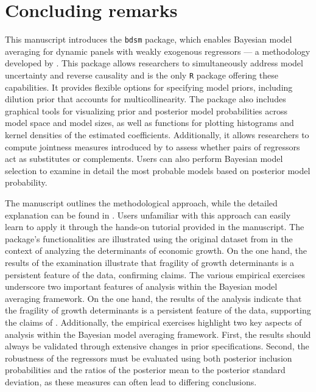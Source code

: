 \documentclass[a4paper]{article}
\begin{document}
\section{Concluding remarks}\label{sum}
This manuscript introduces the \verb+bdsm+ package, which enables Bayesian model averaging for dynamic panels with weakly exogenous regressors — a methodology developed by \citet{Moral+2012,Moral+2013,Moral+2016}.
This package allows researchers to simultaneously address model uncertainty and reverse causality and is the only \verb+R+ package offering these capabilities.
It provides flexible options for specifying model priors, including dilution prior that accounts for multicollinearity.
The package also includes graphical tools for visualizing prior and posterior model probabilities across model space and model sizes, as well as functions for plotting histograms and kernel densities of the estimated coefficients.
Additionally, it allows researchers to compute jointness measures introduced by \citet{Doppelhofer+2009,Ley+2007,Hofmarcher+2018} to assess whether pairs of regressors act as substitutes or complements.
Users can also perform Bayesian model selection to examine in detail the most probable models based on posterior model probability.

The manuscript outlines the methodological approach, while the detailed explanation can be found in \citet{Moral+2012,Moral+2013,Moral+2016}.
Users unfamiliar with this approach can easily learn to apply it through the hands-on tutorial provided in the manuscript.
The package’s functionalities are illustrated using the original dataset from \citet{Moral+2016} in the context of analyzing the determinants of economic growth.
On the one hand, the results of the examination illustrate that fragility of growth determinants is a persistent feature of the data, confirming \citet{Moral+2016} claims.
The various empirical exercises underscore two important features of analysis within the Bayesian model averaging framework.
On the one hand, the results of the analysis indicate that the fragility of growth determinants is a persistent feature of the data, supporting the claims of \citet{Moral+2016}.
Additionally, the empirical exercises highlight two key aspects of analysis within the Bayesian model averaging framework.
First, the results should always be validated through extensive changes in prior specifications.
Second, the robustness of the regressors must be evaluated using both posterior inclusion probabilities and the ratios of the posterior mean to the posterior standard deviation, as these measures can often lead to differing conclusions.




\end{document}
